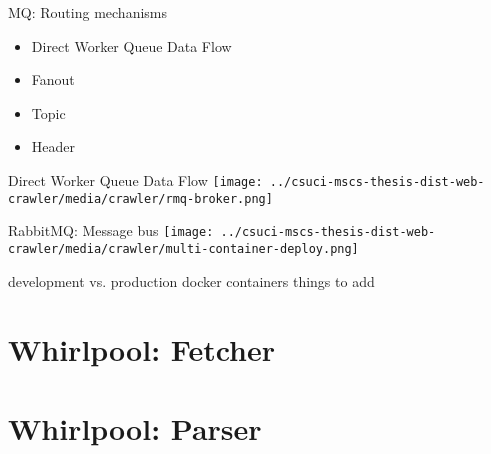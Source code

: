 \documentclass[9pt]{beamer}
\begin{document}

\begin{frame}{MQ: Routing mechanisms}
  \begin{itemize}
    \pause
  \item Direct Worker Queue Data Flow
    \pause
  \item Fanout
    \pause
  \item Topic
    \pause
  \item Header
  \end{itemize}
\end{frame}


\begin{frame}{Direct Worker Queue Data Flow}
  \centering
  \texttt{[image: ../csuci-mscs-thesis-dist-web-crawler/media/crawler/rmq-broker.png]}
\end{frame}


\begin{frame}{RabbitMQ: Message bus}
  \centering
  \texttt{[image: ../csuci-mscs-thesis-dist-web-crawler/media/crawler/multi-container-deploy.png]}
\end{frame}


\begin{frame}{development vs. production docker containers}
  things to add 
\end{frame}


\section[Parser]{Whirlpool: Fetcher}
\begin{frame}[plain]
\end{frame}


\section[Parser]{Whirlpool: Parser}
\begin{frame}[plain]
\end{frame}
\end{document}

